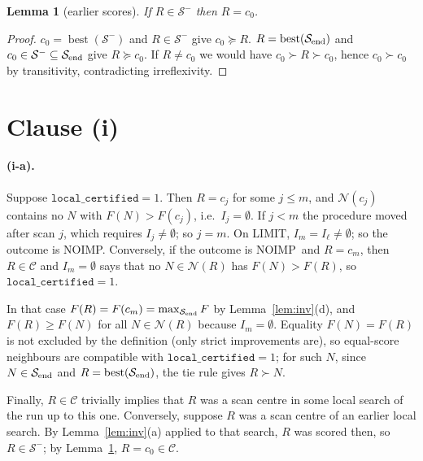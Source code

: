 \documentclass[11pt]{article}
\newtheorem{lemma}{Lemma}
\theoremstyle{remark}
\newcommand{\cS}{\mathcal{S}}
\newcommand{\cN}{\mathcal{N}}
\newcommand{\cC}{\mathcal{C}}
\newcommand{\best}{\operatorname{best}}
\newcommand{\NOIMP}{\textsf{NOIMP}}
\newcommand{\LIMIT}{\textsf{LIMIT}}
\newcommand{\cert}{\texttt{local\_certified}}
\begin{document}
\begin{lemma}[earlier scores]\label{lem:earlier}
If $R\in\cS^-$ then $R=c_0$.
\end{lemma}
\begin{proof}
$c_0=\best(\cS^-)$ and $R\in\cS^-$ give $c_0\succeq R$. $R=\best(\cS_{\rm end})$ and $c_0\in\cS^-\subseteq\cS_{\rm end}$ give $R\succeq c_0$. If $R\ne c_0$ we would have $c_0\succ R\succ c_0$, hence $c_0\succ c_0$ by transitivity, contradicting irreflexivity.
\end{proof}

\section{Clause (i)}

\paragraph{(i-a).}
Suppose $\cert=1$. Then $R=c_j$ for some $j\le m$, and $\cN(c_j)$ contains no $N$ with $F(N)>F(c_j)$, i.e.\ $I_j=\emptyset$. If $j<m$ the procedure moved after scan $j$, which requires $I_j\ne\emptyset$; so $j=m$. On \LIMIT, $I_m=I_\ell\ne\emptyset$; so the outcome is \NOIMP. Conversely, if the outcome is \NOIMP\ and $R=c_m$, then $R\in\cC$ and $I_m=\emptyset$ says that no $N\in\cN(R)$ has $F(N)>F(R)$, so $\cert=1$.

In that case $F(R)=F(c_m)=\max_{\cS_{\rm end}}F$ by Lemma~\ref{lem:inv}(d), and $F(R)\ge F(N)$ for all $N\in\cN(R)$ because $I_m=\emptyset$. Equality $F(N)=F(R)$ is not excluded by the definition (only strict improvements are), so equal-score neighbours are compatible with $\cert=1$; for such $N$, since $N\in\cS_{\rm end}$ and $R=\best(\cS_{\rm end})$, the tie rule gives $R\succ N$.

Finally, $R\in\cC$ trivially implies that $R$ was a scan centre in some local search of the run up to this one. Conversely, suppose $R$ was a scan centre of an earlier local search. By Lemma~\ref{lem:inv}(a) applied to that search, $R$ was scored then, so $R\in\cS^-$; by Lemma~\ref{lem:earlier}, $R=c_0\in\cC$.
\end{document}
